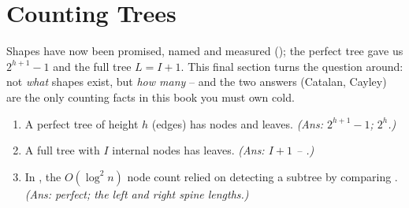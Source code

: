 \section{Counting Trees}\label{sec:c01-counting}

\begin{previouslybox}
Shapes have now been promised, named and measured (); the perfect tree
gave us $2^{h+1}-1$ and the full tree $L=I+1$. This final section turns the question
around: not \emph{what} shapes exist, but \emph{how many} -- and the two answers
(Catalan, Cayley) are the only counting facts in this book you must own cold.

\begin{enumerate}[nosep, leftmargin=1.6em]
  \item A perfect tree of height $h$ (edges) has \underline{\hspace{0.9cm}} nodes and
        \underline{\hspace{0.9cm}} leaves. \emph{(Ans: $2^{h+1}-1$; $2^{h}$.)}
  \item A full tree with $I$ internal nodes has \underline{\hspace{0.9cm}} leaves.
        \emph{(Ans: $I+1$ -- .)}
  \item In , the $O(\log^2 n)$ node count relied on detecting a
        \underline{\hspace{1.4cm}} subtree by comparing \underline{\hspace{1.4cm}}.
        \emph{(Ans: perfect; the left and right spine lengths.)}
\end{enumerate}
\end{previouslybox}

